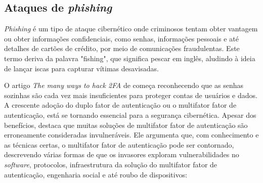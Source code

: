 \documentclass[12pt]{article}
\begin{document}
\subsection{Ataques de \textit{phishing}}

\textit{Phishing} é um tipo de ataque cibernético onde criminosos tentam obter
vantagem ou obter informações confidenciais, como senhas, informações
pessoais e até detalhes de cartões de crédito, por meio de comunicações
fraudulentas.
Este termo deriva da palavra "fishing", que significa pescar em inglês,
aludindo à ideia de lançar iscas para capturar vítimas desavisadas.

O artigo \textit{The many ways to hack 2FA} de \cite{article:3} começa reconhecendo que as senhas
sozinhas são cada vez mais insuficientes para proteger contas de usuários e dados.
A crescente adoção do duplo fator de autenticação ou o multifator fator de autenticação, está
se tornando essencial para a segurança cibernética.
Apesar dos benefícios, \cite{article:3} destaca que muitas soluções de multifator fator de
autenticação são erroneamente consideradas invulneráveis.
Ele argumenta que, com conhecimento e as técnicas certas, o multifator fator de autenticação
pode ser contornado, descrevendo várias formas de que os invasores exploram vulnerabilidades no
\textit{software}, protocolos, infraestrutura da solução do multifator fator de autenticação,
engenharia social e até roubo de dispositivos:
\end{document}
